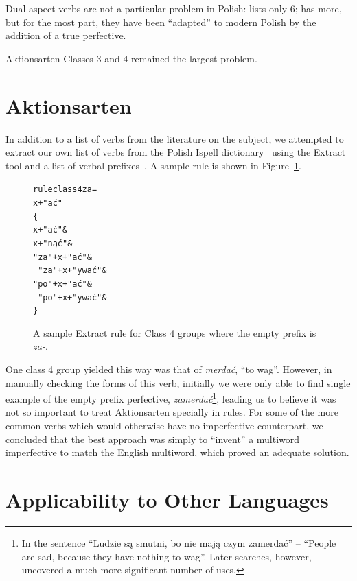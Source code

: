 \documentclass[11pt]{article}
\begin{document}
Dual-aspect verbs are not a particular problem in Polish: \cite{jagod} 
lists only 6; \cite{futrega} has more, but for the most part, they
have been ``adapted'' to modern Polish by the addition of a true
perfective.

Aktionsarten Classes 3 and 4 remained the largest problem.

\section{Aktionsarten}

In addition to a list of verbs from the literature on the 
subject\cite{aalstein07}, we attempted to extract our own list of verbs
from the Polish Ispell dictionary~\cite{futrega} using the Extract
tool\cite{forsberg07} and a list of verbal prefixes~\cite[5.15.2]{bielec}.
A sample rule is shown in Figure~\ref{figure:extract}.

\begin{figure}[htbp]
\label{figure:extract}
\begin{small}
\begin{alltt}
rule class4za = 
x+"ać"
\{ 
  x+"ać" \&
  x+"nąć" \&
  "za"+x+"ać" \&
  ~"za"+x+"ywać" \&
  "po"+x+"ać" \&
  ~"po"+x+"ywać" \&
\}
\end{alltt}
\end{small}
\caption{A sample Extract rule for Class 4 groups where the
empty prefix is {\it za-}.}
\end{figure}

One class 4 group yielded this way was that of {\it merda\'{c}},
``to wag''. However, in manually checking the forms of this verb,
initially we were only able to find single example of the empty prefix 
perfective, {\it zamerda\'{c}}\footnote{In the sentence ``Ludzie s\k{a}
smutni, bo nie maj\k{a} czym zamerda\'{c}'' -- ``People are sad, because
they have nothing to wag''. Later searches, however, uncovered a much 
more significant number of uses.}, leading us to believe it was not so
important to treat Aktionsarten specially in rules. For some of
the more common verbs which would otherwise have no imperfective
counterpart, we concluded that the best approach was simply to ``invent'' 
a multiword imperfective to match the English multiword, which
proved an adequate solution.

\section{Applicability to Other Languages}
\end{document}
